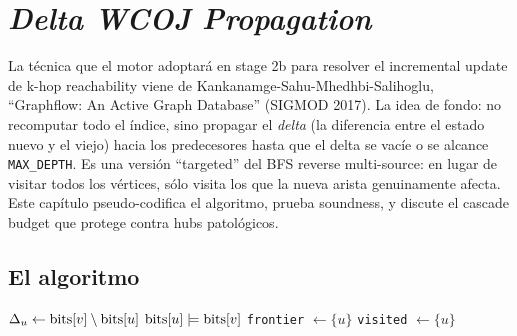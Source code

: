 \chapter{\emph{Delta WCOJ Propagation}}
\label{cap:delta-wcoj}

\begin{intuicion}
La técnica que el motor adoptará en stage 2b para resolver el
incremental update de k-hop reachability viene de
Kankanamge-Sahu-Mhedhbi-Salihoglu, ``Graphflow: An Active Graph
Database'' (SIGMOD 2017). La idea de fondo: no recomputar todo el
índice, sino propagar el \emph{delta} (la diferencia entre el
estado nuevo y el viejo) hacia los predecesores hasta que el delta
se vacíe o se alcance \texttt{MAX\_DEPTH}. Es una versión
``targeted'' del BFS reverse multi-source: en lugar de visitar
todos los vértices, sólo visita los que la nueva arista
genuinamente afecta. Este capítulo pseudo-codifica el algoritmo,
prueba soundness, y discute el cascade budget que protege contra
hubs patológicos.
\end{intuicion}

\section{El algoritmo}

\begin{algorithm}[H]
\caption{\texttt{khop\_reach.delta\_update(u, v, t)} — esquema}
\BlankLine
{}
\(\Delta_u \leftarrow \mathrm{bits}[v] \setminus \mathrm{bits}[u]\)\;
\(\mathrm{bits}[u] \mathrel{|}\!= \mathrm{bits}[v]\)\;
\BlankLine
{}
\texttt{frontier} \(\leftarrow \{u\}\)\;
\texttt{visited} \(\leftarrow \{u\}\)\;
\end{algorithm}

